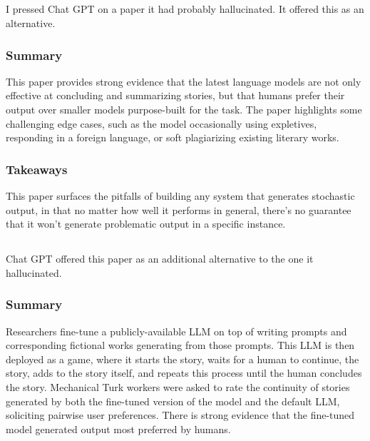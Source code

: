 \documentclass[
	letterpaper, %
]{jdf}
\begin{document}
\subsection{}
I pressed Chat GPT on a paper it had probably hallucinated. It offered this as an alternative.

\subsubsection{Summary}
This paper provides strong evidence that the latest language models are not only effective at concluding and summarizing stories, but that humans prefer their output over smaller models purpose-built for the task. The paper highlights some challenging edge cases, such as the model occasionally using expletives, responding in a foreign language, or soft plagiarizing existing literary works.

\subsubsection{Takeaways}
This paper surfaces the pitfalls of building any system that generates stochastic output, in that no matter how well it performs in general, there's no guarantee that it won't generate problematic output in a specific instance.

\subsection{}
Chat GPT offered this paper as an additional alternative to the one it hallucinated.

\subsubsection{Summary}
Researchers fine-tune a publicly-available LLM on top of writing prompts and corresponding fictional works generating from those prompts. This LLM is then deployed as a game, where it starts the story, waits for a human to continue, the story, adds to the story itself, and repeats this process until the human concludes the story. Mechanical Turk workers were asked to rate the continuity of stories generated by both the fine-tuned version of the model and the default LLM, soliciting pairwise user preferences. There is strong evidence that the fine-tuned model generated output most preferred by humans.
\end{document}
